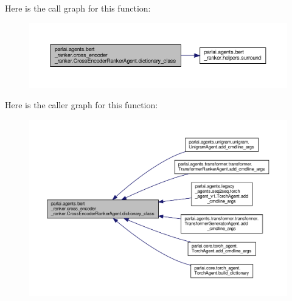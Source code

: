 Here is the call graph for this function\+:
\nopagebreak
\begin{figure}[H]
\begin{center}
\leavevmode
\includegraphics[width=350pt]{classparlai_1_1agents_1_1bert__ranker_1_1cross__encoder__ranker_1_1CrossEncoderRankerAgent_a0518d01be6a05fc2bc117f2c55cb6328_cgraph}
\end{center}
\end{figure}
Here is the caller graph for this function\+:
\nopagebreak
\begin{figure}[H]
\begin{center}
\leavevmode
\includegraphics[width=350pt]{classparlai_1_1agents_1_1bert__ranker_1_1cross__encoder__ranker_1_1CrossEncoderRankerAgent_a0518d01be6a05fc2bc117f2c55cb6328_icgraph}
\end{center}
\end{figure}
\mbox{\label{classparlai_1_1agents_1_1bert__ranker_1_1cross__encoder__ranker_1_1CrossEncoderRankerAgent_aedbc5976f08f86c9587c0b7486879846}} 
